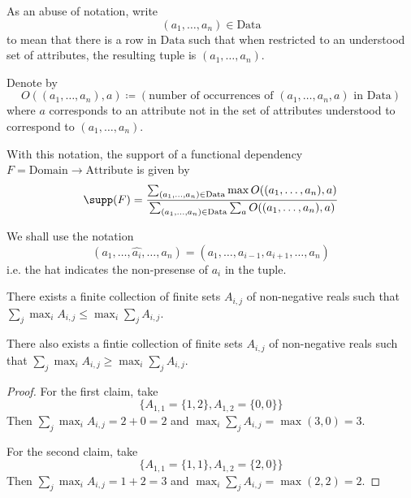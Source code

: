 \documentclass{article}
\begin{document}
As an abuse of notation, write
\begin{equation*}
(a_1,\ldots,a_n) \in \mathrm{Data}
\end{equation*}
to mean that there is a row in $\mathrm{Data}$ such that when restricted to an understood set of attributes, the resulting tuple is $(a_1,\ldots,a_n)$.

Denote by
\begin{equation*}
O((a_1,\ldots,a_n),a) \coloneq (\text{number of occurrences of $(a_1,\ldots,a_n,a)$ in $\mathrm{Data}$})
\end{equation*}
where $a$ corresponds to an attribute not in the set of attributes understood to correspond to $(a_1,\ldots, a_n)$.

With this notation, the support of a functional dependency $F=\mathrm{Domain} \to \mathrm{Attribute}$ is given by
\begin{equation} \label{support definition}
\supp(F) = \dfrac{\sum_{(a_1,\ldots,a_n) \in \mathrm{Data}}{\max O( (a_1,\ldots, a_n), a)}}{\sum_{(a_1,\ldots, a_n) \in \mathrm{Data}}{\sum_a{O((a_1,\ldots, a_n),a)}}}
\end{equation}

We shall use the notation
\begin{equation*}
(a_1,\ldots, \hat{a_i},\ldots,a_n) = (a_1,\ldots, a_{i-1},a_{i+1},\ldots,a_n)
\end{equation*}
i.e. the hat indicates the non-presense of $a_i$ in the tuple.

\begin{lem}
There exists a finite collection of finite sets $A_{i,j}$ of non-negative reals such that
$\sum_j{\max_i{A_{i,j}}} \leq \max_i{\sum_j{A_{i,j}}}$.

There also exists a fintie collection of finite sets $A_{i,j}$ of non-negative reals such that
$\sum_j{\max_i{A_{i,j}}} \geq \max_i{\sum_j{A_{i,j}}}$.
\end{lem}
\begin{proof}
For the first claim, take
\begin{equation*}
\{ A_{1,1} = \{1,2\}, A_{1,2} = \{0,0\}\}
\end{equation*}
Then $\sum_j{\max_i{A_{i,j}}} = 2+0 = 2$ and $\max_i{\sum_j{A_{i,j}}} = \max(3,0) = 3$.

For the second claim, take 
\begin{equation*}
\{ A_{1,1}=\{1,1\}, A_{1,2} = \{2,0\}\}
\end{equation*}
Then $\sum_j{\max_i{A_{i,j}}} = 1+2 =3$ and $\max_i{\sum_j{A_{i,j}}} = \max(2,2)=2$.
\end{proof}
\end{document}
